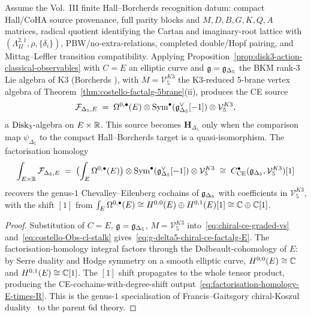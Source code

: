 \begin{theorem}
\label{thm:g-delta5-chiral-ce-factalg-E}
\ClaimStatusConditional
{}
Assume the Vol.~III finite Hall--Borcherds recognition datum: compact
Hall/CoHA source provenance, full parity blocks and
\(M,D,B,G,K,Q,A\) matrices, radical quotient identifying the Cartan and
imaginary-root lattice with \((\Lambda^{2,1}_{II},\rho,\{\delta_i\})\),
PBW/no-extra-relations, completed double/Hopf pairing, and
Mittag--Leffler transition compatibility. Applying
Proposition~\ref{prop:disk3-action-classical-observables}
with $C = E$ an elliptic curve and $\mathfrak g = \mathfrak g_{\Delta_5}$ the BKM
rank-$3$ Lie algebra of K3 (Borcherds \cite{Borcherds1992}), with
$M = \mathcal V^{K3}_5$ the K3-reduced 5-brane vertex algebra of
Theorem~\ref{thm:costello-factalg-5brane}(ii), produces the CE source
\begin{equation}
\label{eq:g-delta5-chiral-ce-factalg-E}
\mathcal F_{\Delta_5,E}
\;=\;
\Omega^{0,\bullet}(E)\otimes
\operatorname{Sym}^\bullet(\mathfrak g_{\Delta_5}^\vee[-1])\otimes
\mathcal V^{K3}_5,
\end{equation}
a $\mathrm{Disk}_3$-algebra on $E\times\mathbb R$. This source becomes
$\mathbf H_{\Delta_5}$ only when the comparison map
$\psi_{\Delta_5}$ to the compact Hall--Borcherds target is a
quasi-isomorphism. The factorisation homology
\begin{equation}
\label{eq:factorisation-homology-E-times-R}
\int_{E\times\mathbb R}\mathcal F_{\Delta_5,E}
\;=\;
\bigl(\int_E\Omega^{0,\bullet}(E)\bigr)
\otimes
\operatorname{Sym}^\bullet(\mathfrak g_{\Delta_5}^\vee[-1])
\otimes
\mathcal V^{K3}_5
\;\cong\;
C^\bullet_{\mathrm{CE}}(\mathfrak g_{\Delta_5}, \mathcal V^{K3}_5)[1]
\end{equation}
recovers the genus-$1$ Chevalley--Eilenberg cochains of $\mathfrak g_{\Delta_5}$
with coefficients in $\mathcal V^{K3}_5$, with the shift $[1]$ from
$\int_E\Omega^{0,\bullet}(E)\cong H^{0,0}(E)\oplus H^{0,1}(E)[1]\cong
\mathbb C\oplus\mathbb C[1]$.
\end{theorem}

\begin{proof}[Proof]
Substitution of $C = E$, $\mathfrak g = \mathfrak g_{\Delta_5}$, $M = \mathcal V^{K3}_5$
into~\eqref{eq:chiral-ce-graded-vs} and~\eqref{eq:costello-Obs-cl-stalk}
gives~\eqref{eq:g-delta5-chiral-ce-factalg-E}. The
factorisation-homology integral factors through the
Dolbeault-cohomology of $E$: by Serre duality and Hodge symmetry on a
smooth elliptic curve, $H^{0,0}(E)\cong\mathbb C$ and
$H^{0,1}(E)\cong\mathbb C[1]$. The $[1]$ shift propagates to the whole tensor
product, producing the CE-cochains-with-degree-shift
output~\eqref{eq:factorisation-homology-E-times-R}. This is the
genus-$1$ specialisation of Francis--Gaitsgory chiral-Koszul
duality~\cite{FrancisGaitsgory2012} to the parent $6$d theory.
\end{proof}

